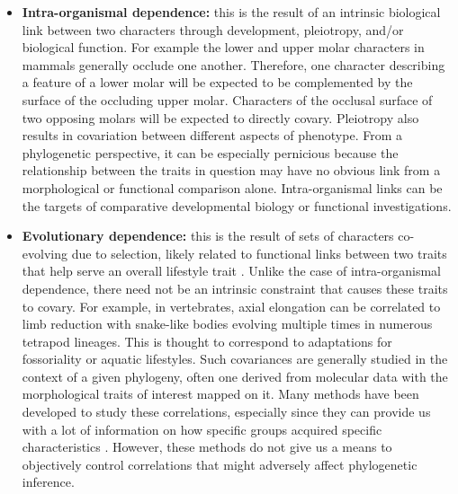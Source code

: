 \documentclass[12pt,letterpaper]{article}
\begin{document}
\begin{itemize}
    \item \textbf{Intra-organismal dependence:} this is the result of an intrinsic biological link between two characters through development, pleiotropy, and/or biological function.
    For example the lower and upper molar characters in mammals generally occlude one another. 
    Therefore, one character describing a feature of a lower molar will be expected to be complemented by the surface of the occluding upper molar.
    Characters of the occlusal surface of two opposing molars will be expected to directly covary.
    Pleiotropy also results in covariation between different aspects of phenotype. 
    From a phylogenetic perspective, it can be especially pernicious because the relationship between the traits in question may have no obvious link from a morphological or functional comparison alone. 
    Intra-organismal links can be the targets of comparative developmental biology \citep{goswami2010,kelly2010reduced,stoessel2013morphological,goswami2014macroevolutionary} or functional investigations. 

    \item \textbf{Evolutionary dependence:} this is the result of sets of characters co-evolving due to selection, likely related to functional links between two traits that help serve an overall lifestyle trait \citep{ClarkeMiddleton2008}. 
    Unlike the case of intra-organismal dependence, there need not be an intrinsic constraint that causes these traits to covary.
    For example, in vertebrates, axial elongation can be correlated to limb reduction with snake-like bodies evolving multiple times in numerous tetrapod lineages.
    This is thought to correspond to adaptations for fossoriality or aquatic lifestyles.
    Such covariances are generally studied in the context of a given phylogeny, often one derived from molecular data with the morphological traits of interest mapped on it.
    Many methods have been developed to study these correlations, especially since they can provide us with a lot of information on how specific groups acquired specific characteristics \citep{Lande1983,Maddison1990,Pagel1994,Pagel2006,Grabowski2016}.
    However, these methods do not give us a means to objectively control correlations that might adversely affect phylogenetic inference.


\end{itemize}
\end{document}
